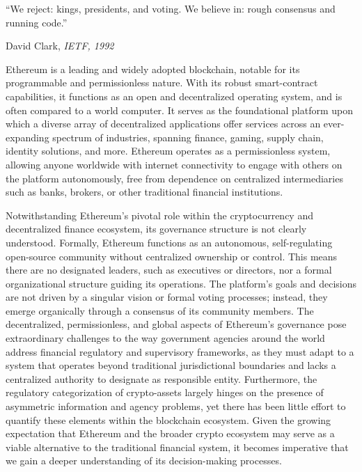 \documentclass[No]{AEA}
\begin{document}
\maketitle


\epigraph{``We reject: kings, presidents, and voting. We believe in: rough consensus and running code.''}{David Clark, \textit{IETF, 1992}}


Ethereum is a leading and widely adopted blockchain, notable for its programmable and permissionless nature. With its robust smart-contract capabilities, it functions as an open and decentralized operating system, and is often compared to a world computer. It serves as the foundational platform upon which a diverse array of decentralized applications offer services across an ever-expanding spectrum of industries, spanning finance, gaming, supply chain, identity solutions, and more. Ethereum operates as a permissionless system, allowing anyone worldwide with internet connectivity to engage with others on the platform autonomously, free from dependence on centralized intermediaries such as banks, brokers, or other traditional financial institutions.

Notwithstanding Ethereum's pivotal role within the cryptocurrency and decentralized finance ecosystem, its governance structure is not clearly understood. Formally, Ethereum functions as an autonomous, self-regulating open-source community without centralized ownership or control. This means there are no designated leaders, such as executives or directors, nor a formal organizational structure guiding its operations. The platform's goals and decisions are not driven by a singular vision or formal voting processes; instead, they emerge organically through a consensus of its community members. The decentralized, permissionless, and global aspects of Ethereum's governance pose extraordinary challenges to the way government agencies around the world address financial regulatory and supervisory frameworks, as they must adapt to a system that operates beyond traditional jurisdictional boundaries and lacks a centralized authority to designate as responsible entity. Furthermore, the regulatory categorization of crypto-assets largely hinges on the presence of asymmetric information and agency problems, yet there has been little effort to quantify these elements within the blockchain ecosystem. Given the growing expectation that Ethereum and the broader crypto ecosystem may serve as a viable alternative to the traditional financial system, it becomes imperative that we gain a deeper understanding of its decision-making processes. 
\end{document}
